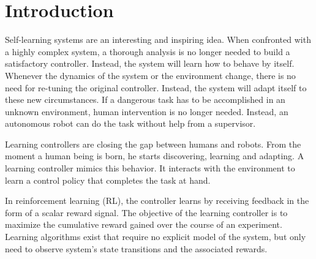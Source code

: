 \documentclass[a4paper,11pt]{mscLiterature}
\begin{document}
   
    
    
    \cleardoublepage
%
    \toc
%    

    \begin{acronym}[XXXXXX]%
		\end{acronym}%
    \cleardoublepage%
%
    \printindex%
    \cleardoublepage%
%
%
\mainmatter
%
\chapter{Introduction} \label{chap:introduction}

Self-learning systems are an interesting and inspiring idea. When confronted with a highly complex system, a thorough analysis is no longer needed to build a satisfactory controller. Instead, the system will learn how to behave by itself. Whenever the dynamics of the system or the environment change, there is no need for re-tuning the original controller. Instead, the system will adapt itself to these new circumstances. If a dangerous task has to be accomplished in an unknown environment, human intervention is no longer needed. Instead, an autonomous robot can do the task without help from a supervisor. 

Learning controllers are closing the gap between humans and robots. From the moment a human being is born, he starts discovering, learning and adapting. A learning controller mimics this behavior. It interacts with the environment to learn a control policy that completes the task at hand. 

	In reinforcement learning (RL), the controller learns by receiving feedback in the form of a scalar reward signal. The objective of the learning controller is to maximize the cumulative reward gained over the course of an experiment. Learning algorithms exist that require no explicit model of the system, but only need to observe system's state transitions and the associated rewards. 
	
\end{document}
